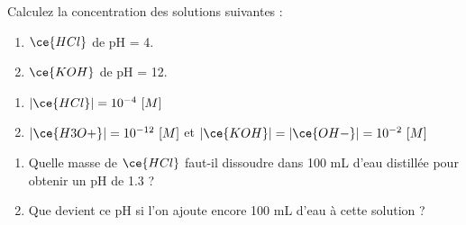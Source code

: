 \documentclass[
  11pt,
  french,
  a4paper,
  openany]{book}
\providecommand{\tightlist}{%
  \setlength{\itemsep}{0pt}\setlength{\parskip}{0pt}}
\begin{document}
\begin{Exercise}

Calculez la concentration des solutions suivantes :

\begin{enumerate}
\def\labelenumi{\alph{enumi}.}
\tightlist
\item
  \(\ce{HCl}\) de pH = 4.
\item
  \(\ce{KOH}\) de pH = 12.
\end{enumerate}


\end{Exercise}

\begin{Answer}

\begin{enumerate}
\def\labelenumi{\alph{enumi}.}
\tightlist
\item
  \(|\ce{HCl}| = 10^{-4}\ [M]\)
  \vspace{1em}
\item
  \(|\ce{H3O+}| = 10^{-12}\ [M]\) et \(|\ce{KOH}| = |\ce{OH-}| = 10^{-2}\ [M]\)
\end{enumerate}


\end{Answer}

\begin{Exercise}

\begin{enumerate}
\def\labelenumi{\alph{enumi}.}
\tightlist
\item
  Quelle masse de \(\ce{HCl}\) faut-il dissoudre dans 100 mL d'eau distillée pour obtenir un pH de 1.3 ?
\item
  Que devient ce pH si l'on ajoute encore 100 mL d'eau à cette solution ?
\end{enumerate}


\end{Exercise}
\end{document}
